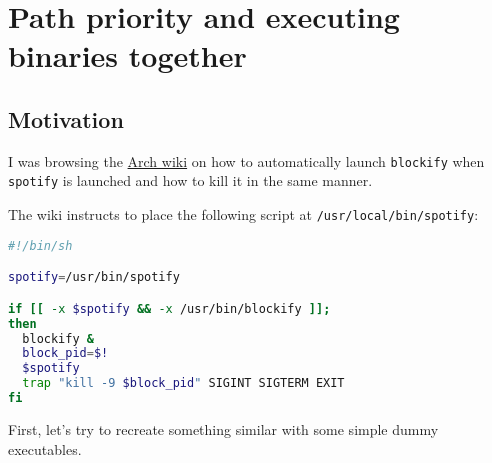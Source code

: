 \documentclass[a4paper]{article}
\begin{document}






\newpage
\tableofcontents
\newpage



\section{Path priority and executing binaries together}



\subsection{Motivation}
I was browsing the \href{https://wiki.archlinux.org/index.php/Spotify#blockify}{Arch wiki} on how to automatically launch \texttt{blockify} when \texttt{spotify} is launched and how to kill it in the same manner.

The wiki instructs to place the following script at \texttt{/usr/local/bin/spotify}:
\begin{lstlisting}[language=bash]
#!/bin/sh

spotify=/usr/bin/spotify

if [[ -x $spotify && -x /usr/bin/blockify ]];
then
  blockify &
  block_pid=$!
  $spotify
  trap "kill -9 $block_pid" SIGINT SIGTERM EXIT
fi

\end{lstlisting}

First, let's try to recreate something similar with some simple dummy executables.
\end{document}
